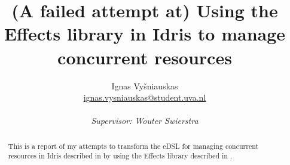 \documentclass{article}
\title{(A failed attempt at) Using the Effects library in Idris to manage concurrent resources}
\author{Ignas Vyšniauskas \\ \url{ignas.vysniauskas@student.uva.nl} \\
    \\ \textit{Supervisor: Wouter Swierstra}}
\begin{document}
\maketitle

\begin{abstract}
    This is a report of my attempts to transform the eDSL for managing
    concurrent resources in Idris described in \cite{cbconc-fi} by using the
    Effects library described in \cite{effects-idr}.
\end{abstract}






\end{document}
